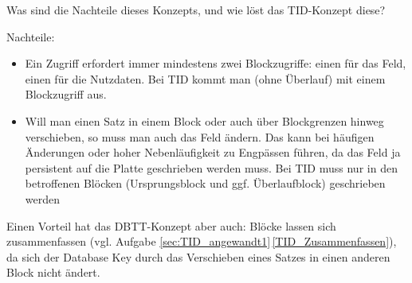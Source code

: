 \begin{enumerate}[a)]
	Was sind die Nachteile dieses Konzepts, und wie löst das TID-Konzept diese?

	\begin{solution}
	Nachteile:
	\begin{itemize}
		\item Ein Zugriff erfordert immer mindestens zwei Blockzugriffe: einen für das Feld, einen für die Nutzdaten.
		Bei TID kommt man (ohne Überlauf) mit einem Blockzugriff aus.
		\item Will man einen Satz in einem Block oder auch über Blockgrenzen hinweg verschieben, so muss man auch das Feld ändern.
		Das kann bei häufigen Änderungen oder hoher Nebenläufigkeit zu Engpässen führen, da das Feld ja persistent auf die Platte geschrieben werden muss.
		Bei TID muss nur in den betroffenen Blöcken (Ursprungsblock und ggf. Überlaufblock) geschrieben werden
	\end{itemize}
	\end{solution}

	\begin{note}
	  Einen Vorteil hat das DBTT-Konzept aber auch: Blöcke lassen sich zusammenfassen (vgl. Aufgabe \ref{sec:TID_angewandt1}\,\ref{TID_Zusammenfassen}), da sich der Database Key durch das Verschieben eines Satzes in einen anderen Block nicht ändert.
	\end{note}
\end{enumerate}
